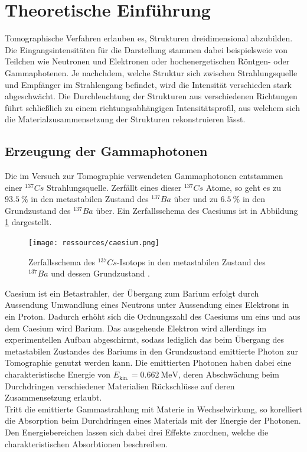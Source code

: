 \section{Theoretische Einführung}
\noindent Tomographische Verfahren erlauben es, Strukturen dreidimensional abzubilden.
Die Eingangsintensitäten für die Darstellung stammen dabei beispielsweie von
Teilchen wie Neutronen und Elektronen oder hochenergetischen Röntgen- oder
Gammaphotenen. Je nachchdem, welche Struktur sich zwischen Strahlungsquelle und
Empfänger im Strahlengang befindet, wird die Intensität verschieden stark
abgeschwächt. Die Durchleuchtung der Strukturen aus verschiedenen Richtungen
führt schließlich zu einem richtungsabhängigen Intensitätsprofil, aus welchem
sich die Materialzusammensetzung der Strukturen rekonstruieren lässt. \\
\subsection{Erzeugung der Gammaphotonen}
\noindent Die im Versuch zur Tomographie verwendeten Gammaphotonen entstammen
einer $^{137}Cs$ Strahlungsquelle. Zerfällt eines dieser $^{137}Cs$ Atome, so
geht es zu $\SI{93.5}{\percent}$ in den metastabilen Zustand des $^{137}Ba$
über und zu $\SI{6.5}{\percent}$ in den Grundzustand des $^{137}Ba$ über. Ein
Zerfallsschema des Caesiums ist in Abbildung \ref{fig:01} dargestellt.
\begin{figure}
  \centering
  \texttt{[image: ressources/caesium.png]}
  \caption{Zerfallsschema des $^{137}Cs$-Isotops in den metastabilen Zustand des
  $^{137}Ba$ und dessen Grundzustand \cite{gil}.}
  \label{fig:01}
\end{figure}
\noindent Caesium ist ein Betastrahler, der Übergang zum Barium erfolgt durch
Aussendung Umwandlung eines Neutrons unter Aussendung eines Elektrons in ein
Proton. Dadurch erhöht sich die Ordnungszahl des Caesiums um eins und aus dem
Caesium wird Barium. Das ausgehende Elektron wird allerdings im experimentellen
Aufbau abgeschirmt, sodass lediglich das beim Übergang des metastabilen Zustandes
des Bariums in den Grundzustand emittierte Photon zur Tomographie genutzt werden
kann. Die emittierten Photonen haben dabei eine charakteristische Energie von
$E_\text{kin.} = \SI{0.662}{\mega\electronvolt}$, deren Abschwächung beim
Durchdringen verschiedener Materialien Rückschlüsse auf deren Zusammensetzung
erlaubt. \\
\noindent Tritt die emittierte Gammastrahlung mit Materie in Wechselwirkung, so
korelliert die Absorption beim Durchdringen eines Materials mit der Energie der
Photonen. Den Energiebereichen lassen sich dabei drei Effekte zuordnen, welche
die charakteristischen Absorbtionen beschreiben. \\
